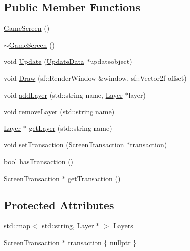 \subsection*{Public Member Functions}
\begin{DoxyCompactItemize}
\item 
\hyperlink{class_game_screen_ae68a867285e0aba9d2b22bff690616ac}{Game\-Screen} ()
\item 
\hyperlink{class_game_screen_a0d25dfce42d72954aab40dbccbf1a0b1}{$\sim$\-Game\-Screen} ()
\item 
void \hyperlink{class_game_screen_aa297aaa006484162d80fe2a5ea15f375}{Update} (\hyperlink{class_update_data}{Update\-Data} $\ast$updateobject)
\item 
void \hyperlink{class_game_screen_afb11360ac509f47ca47929c254a8b67d}{Draw} (sf\-::\-Render\-Window \&window, sf\-::\-Vector2f offset)
\item 
void \hyperlink{class_game_screen_a14685a397e9c9c0ec971f648eeb1ec8b}{add\-Layer} (std\-::string name, \hyperlink{class_layer}{Layer} $\ast$layer)
\item 
void \hyperlink{class_game_screen_ace7d3aad324a781cd22599b56903fb43}{remove\-Layer} (std\-::string name)
\item 
\hyperlink{class_layer}{Layer} $\ast$ \hyperlink{class_game_screen_accd7cd68d80fc29593703ee1741b8996}{get\-Layer} (std\-::string name)
\item 
void \hyperlink{class_game_screen_a1c5d1420883ee7c135747c6aadf7fae9}{set\-Transaction} (\hyperlink{class_screen_transaction}{Screen\-Transaction} $\ast$\hyperlink{class_game_screen_accd7b1f865eb3e0ab95ca4eb8b795b93}{transaction})
\item 
bool \hyperlink{class_game_screen_a5aadb0f4d885be777b3d99f08add9f88}{has\-Transaction} ()
\item 
\hyperlink{class_screen_transaction}{Screen\-Transaction} $\ast$ \hyperlink{class_game_screen_ab148b3dc8dd0921eaf90e52fb61d7817}{get\-Transaction} ()
\end{DoxyCompactItemize}
\subsection*{Protected Attributes}
\begin{DoxyCompactItemize}
\item 
std\-::map$<$ std\-::string, \hyperlink{class_layer}{Layer} $\ast$ $>$ \hyperlink{class_game_screen_ab134d175092c247558838f11d66e9493}{Layers}
\item 
\hyperlink{class_screen_transaction}{Screen\-Transaction} $\ast$ \hyperlink{class_game_screen_accd7b1f865eb3e0ab95ca4eb8b795b93}{transaction} \{ nullptr \}
\end{DoxyCompactItemize}



